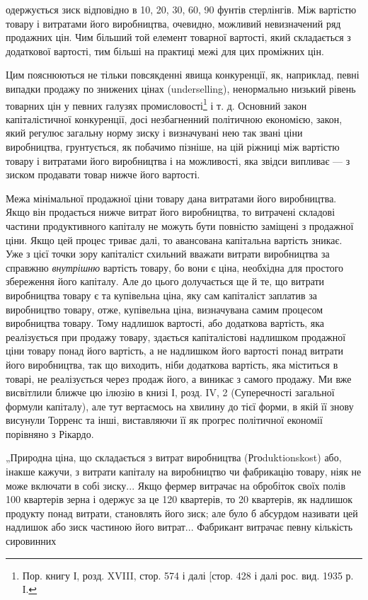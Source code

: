 \parcont{}  %
одержується зиск відповідно в 10, 20, 30, 60, 90 фунтів стерлінгів.
Між вартістю товару і витратами його виробництва, очевидно,
можливий невизначений ряд продажних цін. Чим більший
той елемент товарної вартості, який складається з додаткової
вартості, тим більші на практиці межі для цих проміжних цін.

Цим пояснюються не тільки повсякденні явища конкуренції,
як, наприклад, певні випадки продажу по знижених цінах (underselling),
ненормально низький рівень товарних цін у певних
галузях промисловості\footnote{
Пор. книгу І, розд. XVIII, стор. 574 і далі [стор. 428 і далі рос. вид.
1935 р. І.
} і т. д. Основний закон капіталістичної
конкуренції, досі незбагненний політичною економією, закон,
який регулює загальну норму зиску і визначувані нею так
звані ціни виробництва, грунтується, як побачимо пізніше, на
цій ріжниці між вартістю товару і витратами його виробництва
і на можливості, яка звідси випливає — з зиском продавати
товар нижче його вартості.

Межа мінімальної продажної ціни товару дана витратами
його виробництва. Якщо він продається нижче витрат його
виробництва, то витрачені складові частини продуктивного капіталу
не можуть бути повністю заміщені з продажної ціни.
Якщо цей процес триває далі, то авансована капітальна вартість
зникає. Уже з цієї точки зору капіталіст схильний вважати витрати
виробництва за справжню \emph{внутрішню} вартість товару, бо
вони є ціна, необхідна для простого збереження його капіталу.
Але до цього долучається ще й те, що витрати виробництва
товару є та купівельна ціна, яку сам капіталіст заплатив за
виробництво товару, отже, купівельна ціна, визначувана самим
процесом виробництва товару. Тому надлишок вартості, або
додаткова вартість, яка реалізується при продажу товару,
здається капіталістові надлишком продажної ціни товару понад
його вартість, а не надлишком його вартості понад витрати його
виробництва, так що виходить, ніби додаткова вартість, яка
міститься в товарі, не реалізується через продаж його, а виникає
з самого продажу. Ми вже висвітлили ближче цю ілюзію
в книзі І, розд. IV, 2 (Суперечності загальної формули капіталу),
але тут вертаємось на хвилину до тієї форми, в якій її
знову висунули Торренс та інші, виставляючи її як прогрес політичної
економії порівняно з Рікардо.

„Природна ціна, що складається з витрат виробництва (Ргоduktionskost)
або, інакше кажучи, з витрати капіталу на виробництво
чи фабрикацію товару, ніяк не може включати в собі
зиску... Якщо фермер витрачає на обробіток своїх полів 100
квартерів зерна і одержує за це 120 квартерів, то 20 квартерів,
як надлишок продукту понад витрати, становлять його зиск;
але було б абсурдом називати цей надлишок або зиск частиною
його витрат... Фабрикант витрачає певну кількість сировинних
\parbreak{}  %
